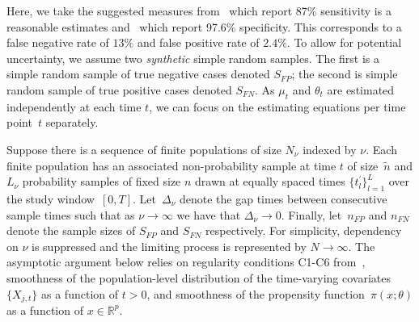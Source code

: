 \documentclass[11pt]{amsart}
\numberwithin{equation}{section}
\theoremstyle{plain}
\begin{document}

Here, we take the suggested measures from~\cite{Arevalo2020} which report 87\% sensitivity is a reasonable estimates and~\cite{Cohen2020} which report 97.6\% specificity.  This corresponds to a false negative rate of $13\%$ and false positive rate of $2.4\%$.  To allow for potential uncertainty, we assume two \emph{synthetic} simple random samples.  The first is a simple random sample of true negative cases denoted $S_{FP}$; the second is simple random sample of true positive cases denoted $S_{FN}$.  As $\mu_t$ and $\theta_{t}$ are estimated independently at each time $t$, we can focus on the estimating equations per time point~$t$ separately.

Suppose there is a sequence of finite populations of size $N_{\nu}$ indexed by $\nu$.  Each finite population has an associated non-probability sample at time $t$ of  size~$\tilde n$ and $L_\nu$ probability samples of fixed size $n$ drawn at equally spaced times $\{ t^\prime_l \}_{l=1}^L$ over the study window~$[0,T]$. Let~$\Delta_\nu$ denote the gap times between consecutive sample times such that as $\nu \to \infty$ we have that $\Delta_\nu \to 0$. Finally, let~$n_{FP}$ and $n_{FN}$ denote the sample sizes of $S_{FP}$ and $S_{FN}$ respectively.  For simplicity, dependency on $\nu$ is suppressed and the limiting process is represented by $N \to \infty$. The asymptotic argument below relies on regularity conditions C1-C6 from~\cite{Chen2019}, smoothness of the population-level distribution of the time-varying covariates~$\{ X_{j,t} \}$ as a function of $t > 0$, and smoothness of the propensity function~$\pi(x; \theta)$ as a function of $x \in \mathbb{R}^p$.
\end{document}
